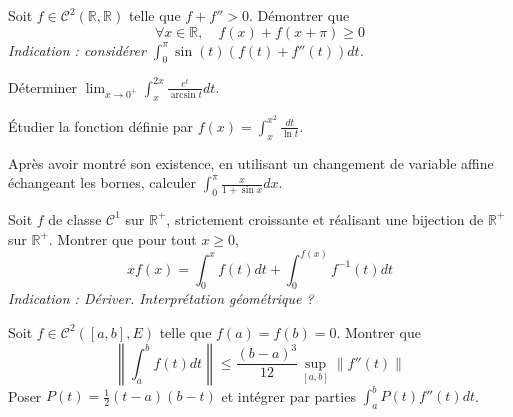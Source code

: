 \begin{exercice}
Soit $f\in \mathcal{C}^{2}(\mathbb{R},\mathbb{R})$ telle que $f+f''>0$. Démontrer que
$$ \forall x\in\mathbb{R}, \quad f(x)+f(x+\pi)\ge0 $$
\textit{Indication : considérer $\int_{0}^{\pi}\sin(t)(f(t)+f''(t))dt$.}
\end{exercice}

\begin{exercice}
Déterminer $\lim_{x\rightarrow0^{+}}\int_{x}^{2x}\frac{e^{t}}{\arcsin t}dt$.
\end{exercice}

\begin{exercice}
Étudier la fonction définie par $f(x)=\int_{x}^{x^{2}}\frac{dt}{\ln t}$.
\end{exercice}

\begin{exercice}
Après avoir montré son existence, en utilisant un changement de variable affine échangeant les bornes, calculer $\int_{0}^{\pi}\frac{x}{1+\sin x}dx$.
\end{exercice}

\begin{exercice}
Soit $f$ de classe $\mathcal{C}^{1}$ sur $\mathbb{R}^{+}$, strictement croissante et réalisant une bijection de $\mathbb{R}^{+}$ sur $\mathbb{R}^{+}$.
Montrer que pour tout $x\ge0$,
$$ xf(x)=\int_{0}^{x}f(t)dt+\int_{0}^{f(x)}f^{-1}(t)dt $$
\textit{Indication : Dériver. Interprétation géométrique ?}
\end{exercice}

\begin{exercice}
Soit $f\in \mathcal{C}^{2}([a,b],E)$ telle que $f(a)=f(b)=0$. Montrer que
$$ \left\| \int_{a}^{b}f(t)dt \right\| \le \frac{(b-a)^{3}}{12} \sup_{[a,b]} \|f''(t)\| $$
Poser $P(t)=\frac{1}{2}(t-a)(b-t)$ et intégrer par parties $\int_{a}^{b}P(t)f''(t)dt$.
\end{exercice}

